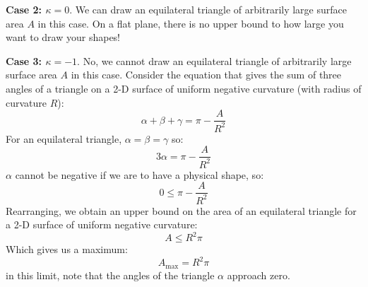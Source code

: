 \noindent \textbf{Case 2: $\kappa = 0$}. We can draw an equilateral triangle of arbitrarily large surface area $A$ in this case. On a flat plane, there is no upper bound to how large you want to draw your shapes!

\noindent \textbf{Case 3: $\kappa = -1$}. No, we cannot draw an equilateral triangle of arbitrarily large surface area $A$ in this case. Consider the equation that gives the sum of three angles of a triangle on a 2-D surface of uniform negative curvature (with radius of curvature $R$):
\begin{equation}
    \alpha + \beta + \gamma = \pi - \frac{A}{R^2}
\end{equation}
For an equilateral triangle, $\alpha = \beta = \gamma$ so:
\begin{equation}
    3\alpha = \pi - \frac{A}{R^2}
\end{equation}
$\alpha$ cannot be negative if we are to have a physical shape, so:
\begin{equation}
    0 \leq \pi - \frac{A}{R^2}
\end{equation}
Rearranging, we obtain an upper bound on the area of an equilateral triangle for a 2-D surface of uniform negative curvature:
\begin{equation}
   A \leq R^2\pi
\end{equation}
Which gives us a maximum:
\begin{equation}
    \boxed{A_{\text{max}} = R^2\pi}
\end{equation}
in this limit, note that the angles of the triangle $\alpha$ approach zero.

